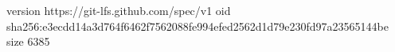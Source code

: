 version https://git-lfs.github.com/spec/v1
oid sha256:e3ecdd14a3d764f6462f7562088fe994efed2562d1d79e230fd97a23565144be
size 6385
